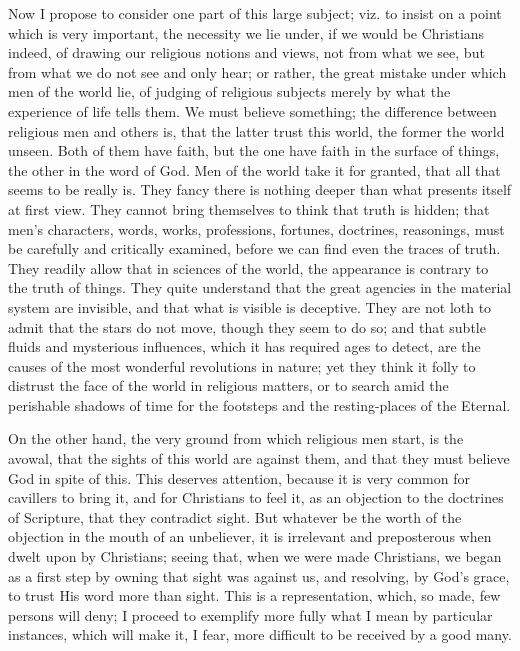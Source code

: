 Now I propose to consider one part of this large subject; viz. to
insist on a point which is very important, the necessity we lie under,
if we would be Christians indeed, of drawing our religious notions and
views, not from what we see, but from what we do not see and only
hear; or rather, the great mistake under which men of the world lie,
of judging of religious subjects merely by what the experience of life
tells them. We must believe something; the difference between
religious men and others is, that the latter trust this world, the
former the world unseen. Both of them have faith, but the one have
faith in the surface of things, the other in the word of God. Men of
the world take it for granted, that all that seems to be really is.
They fancy there is nothing deeper than what presents itself at first
view. They cannot bring themselves to think that truth is hidden; that
men's characters, words, works, professions, fortunes, doctrines,
reasonings, must be carefully and critically examined, before we can
find even the traces of truth. They readily allow that in sciences of
the world, the appearance is contrary to the truth of things. They
quite understand that the great agencies in the material system are
invisible, and that what is visible is deceptive. They are not loth to
admit that the stars do not move, though they seem to do so; and that
subtle fluids and mysterious influences, which it has required ages to
detect, are the causes of the most wonderful revolutions in nature;
yet they think it folly to distrust the face of the world in religious
matters, or to search amid the perishable shadows of time for the
footsteps and the resting-places of the Eternal.

On the other hand, the very ground from which religious men start,
is the avowal, that the sights of this world are against them, and
that they must believe God in spite of this. This deserves attention,
because it is very common for cavillers to bring it, and for
Christians to feel it, as an objection to the doctrines of Scripture,
that they contradict sight. But whatever be the worth of the objection
in the mouth of an unbeliever, it is irrelevant and preposterous when
dwelt upon by Christians; seeing that, when we were made Christians,
we began as a first step by owning that sight was against us, and
resolving, by God's grace, to trust His word more than sight. This is
a representation, which, so made, few persons will deny; I proceed to
exemplify more fully what I mean by particular instances, which will
make it, I fear, more difficult to be received by a good many.

